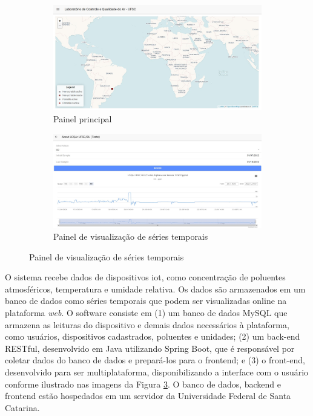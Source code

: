 \begin{figure}[h]
    \centering
    \caption{Aplicação web Renovar}
    \begin{subfigure}{0.495\textwidth}
        \includegraphics[width=\textwidth]{chapters/2-CLEAN/Figuras/Renovar main panel.jpeg}
        \caption{Painel principal}
        \label{fig:renovar-map}
    \end{subfigure}
    \hfill
    \begin{subfigure}{0.495\textwidth}
        \includegraphics[width=\textwidth]{chapters/2-CLEAN/Figuras/ Renovar time series panel.jpg}
        \caption{Painel de visualização de séries temporais}
        \label{fig:renovar-series}
    \end{subfigure}
    \hfill
    \label{fig:renovar-map-and-series}
\end{figure}

O sistema recebe dados de dispositivos \acrshort{iot}, como concentração de poluentes atmosféricos, temperatura e umidade relativa. Os dados são armazenados em um banco de dados como séries temporais que podem ser visualizadas online na plataforma \textit{web}. O software consiste em (1) um banco de dados MySQL que armazena as leituras do dispositivo e demais dados necessários à plataforma, como usuários, dispositivos cadastrados, poluentes e unidades; (2) um back-end RESTful, desenvolvido em Java utilizando Spring Boot, que é responsável por coletar dados do banco de dados e prepará-los para o frontend; e (3) o front-end, desenvolvido para ser multiplataforma, disponibilizando a interface com o usuário conforme ilustrado nas imagens da Figura \ref{fig:renovar-map-and-series}. O banco de dados, backend e frontend estão hospedados em um servidor da Universidade Federal de Santa Catarina.

